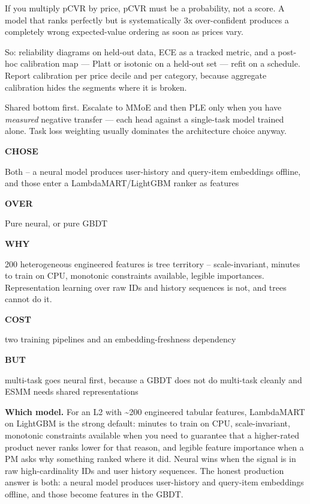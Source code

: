 \documentclass[10pt,twoside]{book}
\newcommand{\csection}[1]{\par\vspace{13pt}\noindent{\sffamily\large\bfseries\color{ink}\raggedright #1\par}\vspace{4pt}}
\newcommand{\csubsection}[1]{\par\vspace{9pt}\noindent{\sffamily\normalsize\bfseries\color{accent}\raggedright #1\par}\vspace{2pt}}
\newenvironment{decide}[1]{%
  \par\smallskip\noindent
  \begin{tcolorbox}[colback=white,colframe=accent,boxrule=1pt,arc=3pt,
    left=8pt,right=8pt,top=6pt,bottom=5pt,
    title={\sffamily\bfseries\small #1},coltitle=white,colbacktitle=accent,
    fonttitle=\sffamily]%
  \small%
}{\end{tcolorbox}\par\smallskip}
\newcommand{\drow}[2]{%
  \par\noindent
  \begin{minipage}[t]{58pt}\raggedright\strut
    {\sffamily\bfseries\scriptsize\color{accent}#1}\end{minipage}%
  \hspace{6pt}%
  \begin{minipage}[t]{\dimexpr\linewidth-64pt\relax}\strut #2\end{minipage}%
  \par\vspace{3.5pt}}
\begin{document}
\csubsection{Calibration}
If you multiply pCVR by price, pCVR must be a probability, not a score. A model that ranks perfectly but is systematically 3x over-confident produces a completely wrong expected-value ordering as soon as prices vary.\par
So: reliability diagrams on held-out data, ECE as a tracked metric, and a post-hoc calibration map --- Platt or isotonic on a held-out set --- refit on a schedule. Report calibration per price decile and per category, because aggregate calibration hides the segments where it is broken.\par
\csection{The ranking model}
\par{}\par\medskip
Shared bottom first. Escalate to MMoE and then PLE only when you have \textit{measured} negative transfer --- each head against a single-task model trained alone. Task loss weighting usually dominates the architecture choice anyway.\par
\begin{decide}{GBDT or neural for the L2?}
\drow{CHOSE}{Both -- a neural model produces user-history and query-item embeddings offline, and those enter a LambdaMART/LightGBM ranker as features}
\drow{OVER}{Pure neural, or pure GBDT}
\drow{WHY}{200 heterogeneous engineered features is tree territory -- scale-invariant, minutes to train on CPU, monotonic constraints available, legible importances. Representation learning over raw IDs and history sequences is not, and trees cannot do it.}
\drow{COST}{two training pipelines and an embedding-freshness dependency}
\drow{BUT}{multi-task goes neural first, because a GBDT does not do multi-task cleanly and ESMM needs shared representations}
\end{decide}
\textbf{Which model.} For an L2 with \textasciitilde{}200 engineered tabular features, LambdaMART on LightGBM is the strong default: minutes to train on CPU, scale-invariant, monotonic constraints available when you need to guarantee that a higher-rated product never ranks lower for that reason, and legible feature importance when a PM asks why something ranked where it did. Neural wins when the signal is in raw high-cardinality IDs and user history sequences. The honest production answer is both: a neural model produces user-history and query-item embeddings offline, and those become features in the GBDT.\par
\end{document}
